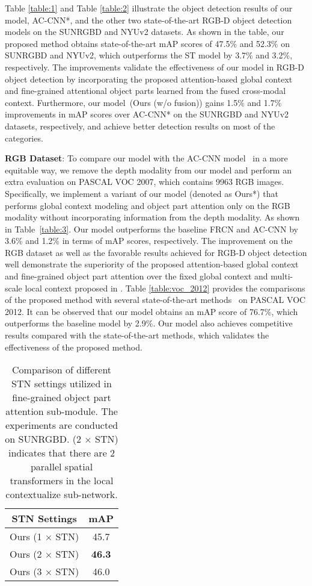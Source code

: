 \documentclass[journal]{IEEEtran}
\begin{document}
Table \ref{table:1} and Table \ref{table:2} illustrate the object detection results of our model, AC-CNN*, and the other two state-of-the-art RGB-D object detection models on the SUNRGBD and NYUv2 datasets. As shown in the table, our proposed method obtains state-of-the-art mAP scores of 47.5\% and 52.3\% on SUNRGBD and NYUv2, which outperforms the ST model \cite{gupta2016cross} by 3.7\% and 3.2\%, respectively. The improvements validate the effectiveness of our model in RGB-D object detection by incorporating the proposed attention-based global context and fine-grained attentional object parts learned from the fused cross-modal context.  Furthermore, our model~(Ours (w/o fusion)) gains 1.5\% and 1.7\% improvements in mAP scores over AC-CNN* on the  SUNRGBD and NYUv2 datasets,  respectively, and achieve better detection results on most of the categories.

\textbf{RGB Dataset}: To compare our model with the AC-CNN model~\cite{li2016attentive} in a more equitable way, we remove the depth modality from our model and perform an extra evaluation on PASCAL VOC 2007, which contains 9963 RGB images. Specifically, we implement a variant of our model (denoted as Ours*) that performs global context modeling and object part attention only on the RGB modality without incorporating information from the depth modality. As shown in Table~\ref{table:3}. Our model outperforms the baseline FRCN \cite{fast-rcnn} and AC-CNN \cite{li2016attentive} by 3.6\% and 1.2\% in terms of mAP scores, respectively. The improvement on the RGB dataset as well as the favorable results achieved for RGB-D object detection well demonstrate the superiority of the proposed attention-based global context and fine-grained object part attention over the fixed global context and multi-scale local context proposed in \cite{li2016attentive}. Table \ref{table:voc_2012} provides the comparisons of the proposed method with several state-of-the-art methods~\cite{ravishankar2008multi, liu2016ssd, shen2017dsod, bell2016inside, dai2016r} on PASCAL VOC 2012. It can be observed that our model obtains an mAP score of 76.7\%, which outperforms the baseline model by 2.9\%. Our model also achieves competitive results compared with the state-of-the-art methods, which validates the effectiveness of the proposed method.

\begin{table} \centering \renewcommand{}
	\caption{\label{table:5} Comparison of different STN settings utilized in fine-grained object part attention sub-module. The experiments are conducted on SUNRGBD. (2 $\times$ STN) indicates that there are 2 parallel spatial transformers in the local contextualize sub-network.}
	\begin{tabular}{c|c}
	\toprule
	\textbf{STN Settings}&\textbf{mAP} \\
	\midrule
	Ours (1 $\times$ STN) & 45.7 \\
	Ours (2 $\times$ STN) & \textbf{46.3} \\
	Ours (3 $\times$ STN) & 46.0 \\
	\bottomrule
	\end{tabular}
\end{table}
\end{document}

